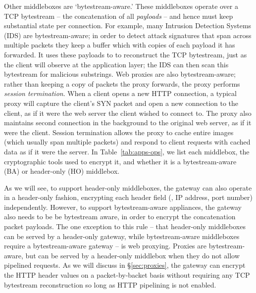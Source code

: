   Other middleboxes are `bytestream-aware.' These middleboxes operate over a TCP bytestream -- the concatenation of all {\it payloads} -- and hence must keep substantial state per connection.
  For example, many Intrusion Detection Systems (IDS) are bytestream-aware; in order to detect attack signatures that span across multiple packets they keep a buffer which with copies of each payload it has forwarded.
  It uses these payloads to to reconstruct the TCP bytestream, just as the client will observe at the application layer; the IDS can then scan this bytestream for malicious substrings.
  Web proxies are also bytestream-aware; rather than keeping a copy of packets the proxy forwards, the proxy performs {\it session termination}. 
  When a client opens a new HTTP connection, a typical proxy will capture the client's SYN packet and open a new connection to the client, as if it were the web server the client wished to connect to. 
  The proxy also maintains second connection in the background to the original web server, as if it were the client. 
  Session termination allows the proxy to cache entire images (which usually span multiple packets) and respond to client requests with cached data as if it were the server.
  In Table~\ref{tab:apps-ops}, we list each middlebox, the cryptographic tools used to encrypt it, and whether it is a bytestream-aware (BA) or header-only (HO) middlebox.

  As we will see, to support header-only middleboxes, the \sys gateway can also operate in a header-only fashion, encrypting each header field (\eg{}, IP address, port number) independently.
  However, to support bytestream-aware appliances, the \sys gateway also needs to be be bytestream aware, in order to encrypt the concatenation packet payloads.
  The one exception to this rule -- that header-only middleboxes can be served by a header-only gateway, while bytestream-aware middleboxes require a bytestream-aware gateway -- is web proxying.
  Proxies are bytestream-aware, but can be served by a header-only middlebox when they do not allow pipelined requests.
  As we will discuss in \S\ref{sec:proxies}, the gateway can encrypt the HTTP header values on a packet-by-backet basis without requiring any TCP bytestream reconstruction so long as HTTP pipelining is not enabled. 


